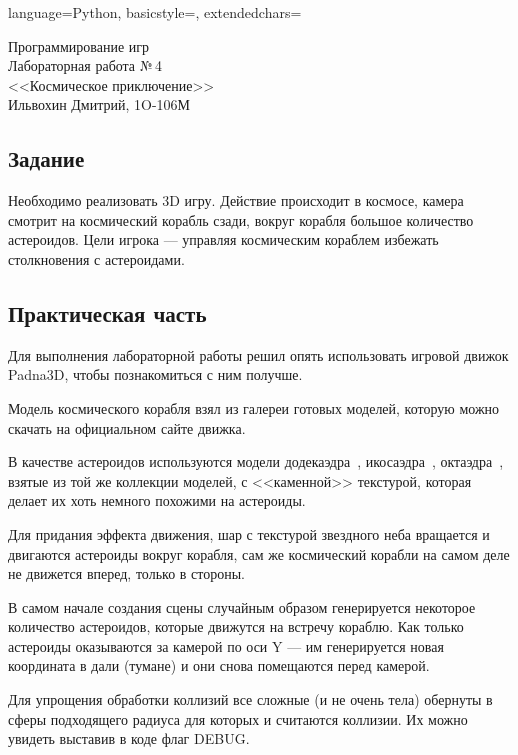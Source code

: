 \documentclass[12pt]{article}
\newcommand{\StudentName}{Ильвохин Дмитрий}
\newcommand{\Group}{1O-106М}
\newcommand{\CourseName}{Программирование игр}
\newcommand{\LabNum}{4}
\newcommand{\Subject}{Космическое приключение}
\begin{document}

\lstset
{
        language=Python,
        basicstyle=\footnotesize,%
        extendedchars=\true
}

\begin{flushright}
\Large{
	\CourseName \\
	Лабораторная работа №\,\LabNum \\
	<<\Subject>> \\
  \StudentName, \Group \\
}
\end{flushright}

\subsection*{Задание}
Необходимо реализовать 3D игру. Действие происходит в космосе, камера смотрит
на космический корабль сзади, вокруг корабля большое количество астероидов.
Цели игрока --- управляя космическим кораблем избежать столкновения с астероидами.

\subsection*{Практическая часть}
Для выполнения лабораторной работы решил опять использовать
игровой движок Padna3D, чтобы познакомиться с ним получше.

Модель космического корабля взял из галереи готовых моделей, которую
можно скачать на официальном сайте движка.~\cite{panda}

В качестве астероидов используются модели додекаэдра~\cite{dodecahedron},
икосаэдра~\cite{icosahedron}, октаэдра~\cite{octahedron},
взятые из той же коллекции моделей, с <<каменной>> текстурой, которая делает
их хоть немного похожими на астероиды.

Для придания эффекта движения, шар с текстурой звездного неба вращается и двигаются
астероиды вокруг корабля, сам же космический корабли на самом деле не движется вперед,
только в стороны.

В самом начале создания сцены случайным образом генерируется некоторое количество астероидов,
которые движутся на встречу кораблю. Как только астероиды оказываются за камерой по оси Y ---
им генерируется новая координата в дали (тумане) и они снова помещаются перед камерой.

Для упрощения обработки коллизий все сложные (и не очень тела) обернуты в сферы подходящего
радиуса для которых и считаются коллизии. Их можно увидеть выставив в коде флаг DEBUG.
\end{document}

